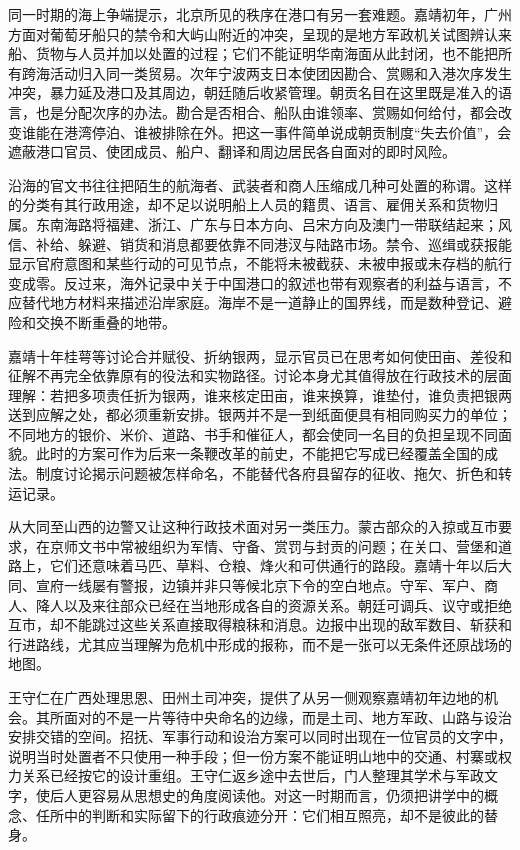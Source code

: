 同一时期的海上争端提示，北京所见的秩序在港口有另一套难题。嘉靖初年，广州方面对葡萄牙船只的禁令和大屿山附近的冲突，呈现的是地方军政机关试图辨认来船、货物与人员并加以处置的过程；它们不能证明华南海面从此封闭，也不能把所有跨海活动归入同一类贸易。次年宁波两支日本使团因勘合、赏赐和入港次序发生冲突，暴力延及港口及其周边，朝廷随后收紧管理。朝贡名目在这里既是准入的语言，也是分配次序的办法。勘合是否相合、船队由谁领率、赏赐如何给付，都会改变谁能在港湾停泊、谁被排除在外。把这一事件简单说成朝贡制度“失去价值”，会遮蔽港口官员、使团成员、船户、翻译和周边居民各自面对的即时风险。

沿海的官文书往往把陌生的航海者、武装者和商人压缩成几种可处置的称谓。这样的分类有其行政用途，却不足以说明船上人员的籍贯、语言、雇佣关系和货物归属。东南海路将福建、浙江、广东与日本方向、吕宋方向及澳门一带联结起来；风信、补给、躲避、销货和消息都要依靠不同港汊与陆路市场。禁令、巡缉或获报能显示官府意图和某些行动的可见节点，不能将未被截获、未被申报或未存档的航行变成零。反过来，海外记录中关于中国港口的叙述也带有观察者的利益与语言，不应替代地方材料来描述沿岸家庭。海岸不是一道静止的国界线，而是数种登记、避险和交换不断重叠的地带。

嘉靖十年桂萼等讨论合并赋役、折纳银两，显示官员已在思考如何使田亩、差役和征解不再完全依靠原有的役法和实物路径。讨论本身尤其值得放在行政技术的层面理解：若把多项责任折为银两，谁来核定田亩，谁来换算，谁垫付，谁负责把银两送到应解之处，都必须重新安排。银两并不是一到纸面便具有相同购买力的单位；不同地方的银价、米价、道路、书手和催征人，都会使同一名目的负担呈现不同面貌。此时的方案可作为后来一条鞭改革的前史，不能把它写成已经覆盖全国的成法。制度讨论揭示问题被怎样命名，不能替代各府县留存的征收、拖欠、折色和转运记录。

从大同至山西的边警又让这种行政技术面对另一类压力。蒙古部众的入掠或互市要求，在京师文书中常被组织为军情、守备、赏罚与封贡的问题；在关口、营堡和道路上，它们还意味着马匹、草料、仓粮、烽火和可供通行的路段。嘉靖十年以后大同、宣府一线屡有警报，边镇并非只等候北京下令的空白地点。守军、军户、商人、降人以及来往部众已经在当地形成各自的资源关系。朝廷可调兵、议守或拒绝互市，却不能跳过这些关系直接取得粮秣和消息。边报中出现的敌军数目、斩获和行进路线，尤其应当理解为危机中形成的报称，而不是一张可以无条件还原战场的地图。

王守仁在广西处理思恩、田州土司冲突，提供了从另一侧观察嘉靖初年边地的机会。其所面对的不是一片等待中央命名的边缘，而是土司、地方军政、山路与设治安排交错的空间。招抚、军事行动和设治方案可以同时出现在一位官员的文字中，说明当时处置者不只使用一种手段；但一份方案不能证明山地中的交通、村寨或权力关系已经按它的设计重组。王守仁返乡途中去世后，门人整理其学术与军政文字，使后人更容易从思想史的角度阅读他。对这一时期而言，仍须把讲学中的概念、任所中的判断和实际留下的行政痕迹分开：它们相互照亮，却不是彼此的替身。

